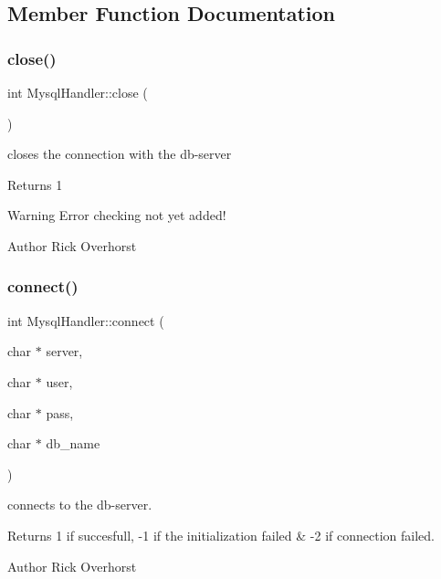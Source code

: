 \subsection{Member Function Documentation}
\mbox{\label{classMysqlHandler_aef277d872eb51db9ce2fe66fed348941}} 
\subsubsection{\texorpdfstring{close()}{close()}}
{\footnotesize\ttfamily int Mysql\+Handler\+::close (\begin{DoxyParamCaption}{ }\end{DoxyParamCaption})}



closes the connection with the db-\/server 

\begin{DoxyReturn}{Returns}
1 
\end{DoxyReturn}
\begin{DoxyWarning}{Warning}
Error checking not yet added! 
\end{DoxyWarning}
\begin{DoxyAuthor}{Author}
Rick Overhorst 
\end{DoxyAuthor}
\mbox{\label{classMysqlHandler_acd74d4ee6a2853d07218cd7a300ee6d2}} 
\subsubsection{\texorpdfstring{connect()}{connect()}}
{\footnotesize\ttfamily int Mysql\+Handler\+::connect (\begin{DoxyParamCaption}\item[{char $\ast$}]{server,  }\item[{char $\ast$}]{user,  }\item[{char $\ast$}]{pass,  }\item[{char $\ast$}]{db\+\_\+name }\end{DoxyParamCaption})}



connects to the db-\/server. 

\begin{DoxyReturn}{Returns}
1 if succesfull, -\/1 if the initialization failed \& -\/2 if connection failed. 
\end{DoxyReturn}
\begin{DoxyAuthor}{Author}
Rick Overhorst 
\end{DoxyAuthor}
\mbox{\label{classMysqlHandler_abee4d47196df8c42420fe771508a6ff9}} 
